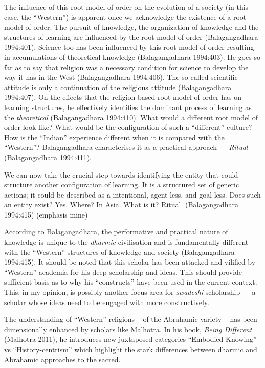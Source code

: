 The influence of this root model of order on the evolution of a society (in this case, the “Western”) is apparent once we acknowledge the existence of a root model of order. The pursuit of knowledge, the organization of knowledge and the structures of learning are influenced by the root model of order (Balagangadhara 1994:401). Science too has been influenced by this root model of order resulting in accumulations of theoretical knowledge (Balagangadhara 1994:403). He goes so far as to say that religion was a necessary condition for science to develop the way it has in the West (Balagangadhara 1994:406). The so-called scientific attitude is only a continuation of the religious attitude (Balagangadhara 1994:407). On the effects that the religion based root model of order has on learning structures, he effectively identifies the dominant process of learning as the \textit{theoretical} (Balagangadhara 1994:410). What would a different root model of order look like? What would be the configuration of such a “different” culture? How is the “Indian” experience different when it is compared with the “Western”? Balagangadhara characterises it as a practical approach — \textit{Ritual} (Balagangadhara 1994:411).

We can now take the crucial step towards identifying the entity that could structure another configuration of learning. It is a structured set of generic actions; it could be described as a-intentional, agent-less, and goal-less. Does such an entity exist? Yes. Where? In Asia. What is it? Ritual. \hfill (Balagangadhara 1994:415) (emphasis mine)

According to Balagangadhara, the performative and practical nature of knowledge is unique to the \textit{dharmic} civilisation and is fundamentally different with the “Western” structures of knowledge and society (Balagangadhara 1994:415). It should be noted that this scholar has been attacked and vilified by “Western” academia for his deep scholarship and ideas. This should provide sufficient basis as to why his “constructs” have been used in the current context. This, in my opinion, is possibly another focus-area for \textit{swadeshi} scholarship — a scholar whose ideas need to be engaged with more constructively.

The understanding of “Western” religions – of the Abrahamic variety – has been dimensionally enhanced by scholars like Malhotra. In his book, \textit{Being Different} (Malhotra 2011), he introduces new juxtaposed categories “Embodied Knowing” vs “History-centrism” which highlight the stark differences between dharmic and Abrahamic approaches to the sacred.

